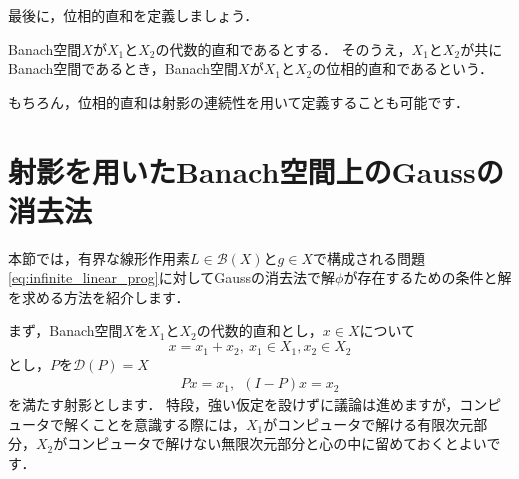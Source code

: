 最後に，位相的直和を定義しましょう．
\begin{defi}[位相的直和]
	Banach空間$X$が$X_1$と$X_2$の代数的直和であるとする．
	そのうえ，$X_1$と$X_2$が共にBanach空間であるとき，Banach空間$X$が$X_1$と$X_2$の位相的直和であるという．
\end{defi}

もちろん，位相的直和は射影の連続性を用いて定義することも可能です．

%
\section{射影を用いたBanach空間上のGaussの消去法}\label{sec:infgauss}
本節では，有界な線形作用素$L \in {\mathcal B}(X)$と$g \in X$で構成される問題\eqref{eq:infinite_linear_prog}に対してGaussの消去法で解$\phi$が存在するための条件と解を求める方法を紹介します．

まず，Banach空間$X$を$X_1$と$X_2$の代数的直和とし，$x \in X$について
\[
x = x_1 + x_2, ~ x_1 \in X_1, x_2 \in X_2
\]
とし，$P$を${\mathcal D}(P) = X$
\begin{align*}
	P x = x_1,~ ~ (I - P)x = x_2
\end{align*}
を満たす射影とします．
特段，強い仮定を設けずに議論は進めますが，コンピュータで解くことを意識する際には，$X_1$がコンピュータで解ける有限次元部分，$X_2$がコンピュータで解けない無限次元部分と心の中に留めておくとよいです．


